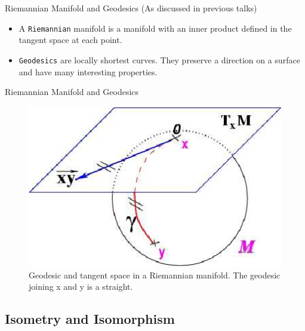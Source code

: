 \documentclass{beamer}
\begin{document}
\begin{frame}{Riemannian Manifold and Geodesics}
(As discussed in previous talks)
\begin{itemize}
\item A \texttt{Riemannian} manifold is a manifold with an inner product defined in the tangent space at each point.


\item \texttt{Geodesics} are locally shortest curves. They preserve a direction on a surface and have many interesting properties.
\end{itemize}

\end{frame}

\begin{frame}{Riemannian Manifold and Geodesics}

\begin{figure}
 \includegraphics[height=0.3\textwidth]{Geodesics2.png}
 \caption{\label{fig:Geodesics}Geodesic and tangent space in a Riemannian manifold. The geodesic joining x and y is a straight.}
\end{figure}

\end{frame}


\subsection{Isometry and Isomorphism}
\end{document}
